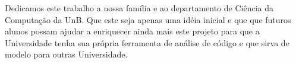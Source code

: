 Dedicamos este trabalho a nossa família e ao departamento de Ciência da Computação da UnB. Que este seja apenas uma idéia inicial e que que futuros alunos possam ajudar a enriquecer ainda mais este projeto para que a Universidade tenha sua própria ferramenta de análise de código e que sirva de modelo para outras Universidade.